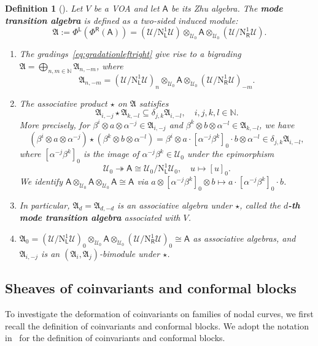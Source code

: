 \documentclass[12pt,a4paper,reqno]{amsart}
\numberwithin{equation}{section}
\newtheorem{definition}[theorem]{Definition}
\theoremstyle{definition}
\newcommand{\N}{\mathbb{N}}
\def\L{\mathsf{L}}
\def\R{\mathsf{R}}
\def \al{\alpha}
\def \b{\beta}
\def\o{\otimes}
\def\scrU{\mathscr{U}}
\def\fA{\mathfrak{A}}
\def\ssq{\subseteq}
\def\rN{\mathrm{N}}
\def\A{\mathsf{A}}
\begin{document}
\begin{definition}[{\cite[Definition 3.2.1]{DGK2}}]\label{def:mta}
    Let $V$ be a VOA and let $\A$ be its Zhu algebra. The \textbf{mode transition algebra} is defined as a two-sided induced module:
    \[
    \fA:=\Phi^\L(\Phi^\R(\A))=(\scrU/\rN^1_\L\scrU)\o_{\scrU_0}\A\o_{\scrU_0} (\scrU/\rN^1_\R\scrU).
    \]
  	\begin{enumerate}
			\item   The gradings~\eqref{eq:gradationleftright} give rise to a bigrading	$\fA=\bigoplus_{n,m\in \N} \fA_{n,-m}$, where
			\begin{equation}\label{eq:defAn-m}
				\fA_{n,-m}=(\scrU/	\rN^1_\L \scrU)_{n}\o _{\scrU_0} \A\o _{\scrU_0} (\scrU/\rN^1_\R \scrU)_{-m}.
			\end{equation}
			\item 	The associative product $\star$ on $\fA$ satisfies
			\[\fA_{i,-j}\star \fA_{k,-l}\ssq \delta_{j,k}\fA_{i,-l},\quad i,j,k,l\in \N.\]
			More precisely, for $\b^i\o a\o \al^{-j}\in \fA_{i,-j}$ and $\b^k\o b\o \al^{-l}\in \fA_{k,-l}$, we have
			\begin{equation}\label{eq:defofprodonmta}
				\left(\b^i\o a\o \al^{-j}\right) \star \left(\b^k\o b\o \al^{-l}\right)= \b^i\o a\cdot [\al^{-j}\b^k]_0\cdot b\o \al^{-l}\in \delta_{j,k}\fA_{i,-l},
			\end{equation}
				where $[\al^{-j}\b^k]_0$ is the image of $\al^{-j}\b^k\in \scrU_0$ under the epimorphism \[\scrU_0\twoheadrightarrow \A\cong \scrU_0/\rN^1_\L\scrU_0,\quad u\mapsto [u]_0.\] We identify $\A\o_{\scrU_0} \A\o_{\scrU_0} \A\cong \A$ via $a\o  [\al^{-j}\b^k]_0\o b\mapsto a\cdot [\al^{-j}\b^k]_0\cdot b$.
			\item 	In particular,
			$\fA_d=\fA_{d,-d}$ is an associative algebra under $\star$, called the \textbf{$d$-th mode transition algebra} associated with $V$.
			\item 	 $\fA_0=(\scrU/	\rN^1_\L \scrU)_0\o_{\scrU_0} \A\o_{\scrU_0} (\scrU/	\rN^1_\R \scrU)_{0}\cong \A$ as associative algebras, and $\fA_{i,-j}$ is an $(\fA_{i},\fA_j)$-bimodule under $\star$.
		\end{enumerate}
\end{definition}

\subsection{Sheaves of coinvariants and conformal blocks}

To investigate the deformation of coinvariants on families of nodal curves, we first recall the definition of coinvariants and conformal blocks. We adopt the notation in~\cite{DGT2,frenkel_ben_zvi_book,NT} for the definition of coinvariants and conformal blocks.
\end{document}
